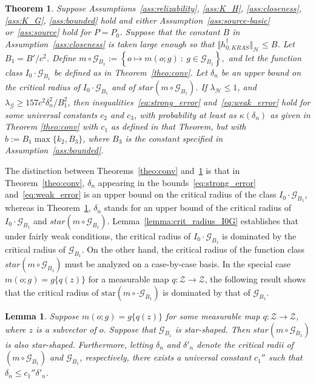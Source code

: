 \documentclass[twoside,11pt]{article}
\newtheorem{theorem}{Theorem}
\newtheorem{lemma}{Lemma}
\newcommand{\mc}{\mathcal}
\begin{document}
\begin{theorem} Suppose Assumptions~\ref{ass:relizability}, \ref{ass:K_H}, \ref{ass:closeness}, \ref{ass:K_G}, \ref{ass:bounded} hold and either Assumption~\ref{ass:source-basic} or~\ref{ass:source} hold for $P=P_0$. Suppose that the constant $B$  in Assumption~\ref{ass:closeness} is taken large enough so that $\big\Vert h_{0,KRAS}^\dag\big\Vert_{\mc{H}}\le B$. Let $B_1=B'/c^2$. Define
$
m\circ \mc{G}_{B_1}:=\left\{o \mapsto m(o;g)\::\:g\in\mc{G}_{B_1}\right\},
$
and let the function class $I_0\cdot\mc{G}_{B_1}$ be defined as in Theorem~\ref{theo:conv}. Let $\delta_n$ be an upper bound on the critical radius of $I_0\cdot\mc{G}_{B_1}$ and of $star(m\circ \mc{G}_{B_1})$. If $\lambda_{\mc{H}}\le 1$, and $\lambda_\mc{G}\ge157c^2\delta_n^2/B_1^2$, then inequalities~\eqref{eq:strong_error} and~\eqref{eq:weak_error} hold for some universal constants $c_2$ and $c_3$, with probability at least as $\kappa(\delta_n)$ as given in Theorem \ref{theo:conv} with $c_1$ as defined in that Theorem, but with $b:=B_1\max\{k_2,B_3\}$, where $B_3$ is the constant specified in Assumption~\ref{ass:bounded}.
    \label{theo:main}
\end{theorem}

The distinction between Theorems~\ref{theo:conv} and~\ref{theo:main} is that in Theorem~\ref{theo:conv}, $\delta_n$ appearing in the bounds~\eqref{eq:strong_error} and~\eqref{eq:weak_error} is an upper bound on the critical radius of the class $I_0\cdot\mc{G}_{B_1}$, whereas in Theorem~\ref{theo:main}, $\delta_n$ stands for an upper bound of the critical radius of  $I_0\cdot\mc{G}_{B_1}$ and  $star(m\circ\mc{G}_{B_1})$. Lemma~\ref{lemma:crit_radius_I0G} establishes that under fairly weak conditions, the critical radius of $I_0\cdot\mc{G}_{B_1}$ is dominated by the critical radius of $\mc{G}_{B_1}$. On the other hand, the critical radius of the function class $star(m\circ\mc{G}_{B_1})$ must be analyzed on a case-by-case basis. In the special case  $m(o;g)=g\{q(z)\}$ for a measurable map $q:\mc{Z}\rightarrow\mc{Z}$, the following result shows that the critical radius of $\mathrm{star}(m\circ\cdot \mc{G}_{B_1})$ is dominated by that of $\mc{G}_{B_1}$.

\begin{lemma}
Suppose $m(o;g)=g\{q(z)\}$ for some measurable map $q:\mc{Z}\rightarrow\mc{Z}$, where $z$ is a subvector of $o$. Suppose that $\mc{G}_{B_1}$ is star-shaped. Then $star(m\circ\mc{G}_{B_1})$ is also star-shaped. Furthermore, letting $\delta_n$ and $\delta'_n$ denote the critical radii of $(m\circ\mc{G}_{B_1})$ and $\mc{G}_{B_1}$, respectively, there exists a universal constant $c_1''$ such that $ 
    \delta_n\le c_1''\delta'_n$.\label{lemma:crit_radius_mG}
\end{lemma}
\end{document}
